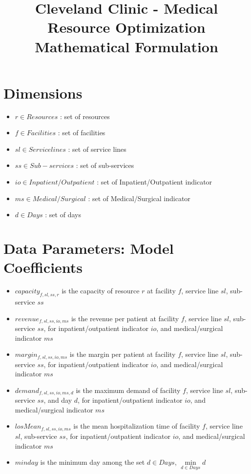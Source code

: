\documentclass[10pt, letterpaper]{article}
\begin{document}
\title{Cleveland Clinic - Medical Resource Optimization Mathematical Formulation}
\maketitle


\section*{Dimensions}
\begin{itemize}
\item[ ] $ r \in Resources$ : set of resources
\item[ ] $ f \in Facilities$ : set of facilities
\item[ ] $ sl \in Service lines$ : set of service lines
\item[ ] $ ss \in Sub-services$ : set of sub-services
\item[ ] $ io \in Inpatient/Outpatient$ : set of Inpatient/Outpatient indicator
\item[ ] $ ms \in Medical/Surgical$ : set of Medical/Surgical indicator
\item[ ] $ d \in Days$ : set of days
\end{itemize}

\section*{Data Parameters: Model Coefficients}
\begin{itemize}
\item[ ] $capacity_{f,sl,ss,r}$  is the capacity of resource $r$ at facility $f$, service line $sl$, sub-service $ss$
\item[ ] $revenue_{f,sl,ss,io,ms}$  is the revenue per patient at facility $f$, service line $sl$, sub-service $ss$, for inpatient/outpatient indicator $io$, and medical/surgical indicator $ms$
\item[ ] $margin_{f,sl,ss,io,ms}$  is the margin per patient at facility $f$, service line $sl$, sub-service $ss$, for inpatient/outpatient indicator $io$, and medical/surgical indicator $ms$
\item[ ] $demand_{f,sl,ss,io,ms,d}$ is the maximum demand of facility $f$, service line $sl$, sub-service $ss$, and day $d$, for inpatient/outpatient indicator $io$, and medical/surgical indicator $ms$
\item[ ] $losMean_{f,sl,ss,io,ms}$  is the mean hospitalization time of facility $f$, service line $sl$, sub-service $ss$, for inpatient/outpatient indicator $io$, and medical/surgical indicator $ms$
\item[ ] $minday$ is the minimum day among the set $ d \in Days$, ${\min\limits_{d \in Days} d}$
\end{itemize}
\end{document}
